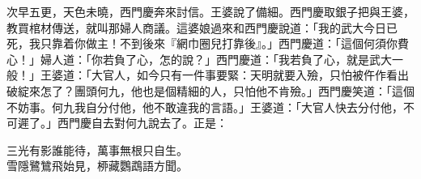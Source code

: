 次早五更，天色未曉，西門慶奔來討信。王婆說了備細。西門慶取銀子把與王婆，教買棺材傳送，就叫那婦人商議。這婆娘過來和西門慶說道：「我的武大今日已死，我只靠着你做主！不到後來『網巾圈兒打靠後』。」西門慶道：「這個何須你費心！」婦人道：「你若負了心，怎的說？」西門慶道：「我若負了心，就是武大一般！」{}王婆道：「大官人，如今只有一件事要緊：天明就要入殮，只怕被仵作看出破綻來怎了？團頭何九，他也是個精細的人，只怕他不肯殮。」西門慶笑道：「這個不妨事。何九我自分付他，他不敢違我的言語。」王婆道：「大官人快去分付他，不可遲了。」西門慶自去對何九說去了。正是：

\begin{myquote} 
三光有影誰能待，萬事無根只自生。\\雪隱鷺鷥飛始見，桺藏鸚鵡語方聞。
\end{myquote} 

